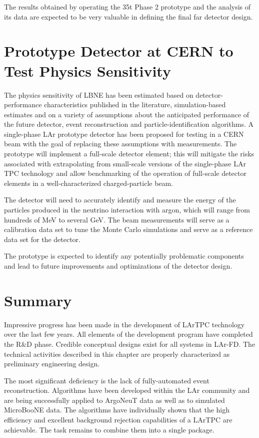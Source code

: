 The results obtained by operating the 35t Phase 2 prototype and the analysis of its data are expected
to be very valuable in defining the final far detector design. 

\section{Prototype Detector at CERN to Test Physics Sensitivity}

The physics sensitivity of LBNE has been estimated based on detector-performance characteristics published in the literature, simulation-based estimates
and on a variety of assumptions about the anticipated performance of the future detector, event reconstruction and particle-identification algorithms.
A single-phase LAr prototype detector has been proposed for testing in a CERN beam with the goal of
 replacing these assumptions with measurements.  The prototype will implement a full-scale detector element; this will 
 mitigate the risks associated with extrapolating from small-scale versions of the single-phase LAr TPC technology and allow benchmarking of the operation of full-scale detector elements in a well-characterized charged-particle beam.  

The detector will need to accurately identify and measure the energy of the particles produced in the neutrino interaction with argon, which will range from hundreds of MeV to several GeV.
The beam measurements will serve as a calibration data set to tune the Monte Carlo simulations and serve as a reference data set for the detector. 

The prototype is expected to identify any potentially problematic components and lead to future improvements and optimizations of the detector design.



\section{Summary}

Impressive progress has been made in the development of LArTPC technology over the last few years. All elements of the development program have completed the R\&D phase. Credible conceptual designs exist for all systems in LAr-FD. The technical activities described in this chapter are properly characterized as preliminary engineering design.

The most significant deficiency is the lack of fully-automated event reconstruction. Algorithms have been developed within the LAr community and are being successfully applied to ArgoNeuT data as well as to simulated MicroBooNE data. The algorithms have individually shown that the high efficiency and excellent background rejection capabilities of a LArTPC are achievable. The task remains to combine them into a single package. 


